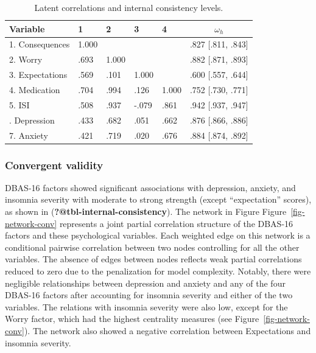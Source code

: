 \documentclass[
  12pt,
  twoside,
  openright,
  a4paper,
  chapter=TITLE,
  section=TITLE,
  brazil]{abntex2}
\begin{document}
\begin{table}[!h]

\caption{Latent correlations and internal consistency levels.}
\centering
\begin{tabular}[t]{lllllc}
\toprule
Variable & 1 & 2 & 3 & 4 & $\omega_h$\\
\midrule
1. Consequences & 1.000 &  &  &  & .827 [.811, .843]\\
2. Worry & .693 & 1.000 &  &  & .882 [.871, .893]\\
3. Expectations & .569 & .101 & 1.000 &  & .600 [.557, .644]\\
4. Medication & .704 & .994 & .126 & 1.000 & .752 [.730, .771]\\
5. ISI & .508 & .937 & -.079 & .861 & .942 [.937, .947]\\
\addlinespace
6. Depression & .433 & .682 & .051 & .662 & .876 [.866, .886]\\
7. Anxiety & .421 & .719 & .020 & .676 & .884 [.874, .892]\\
\bottomrule
\end{tabular}
\end{table}

\hypertarget{convergent-validity}{%
\subsubsection{Convergent validity}\label{convergent-validity}}

DBAS-16 factors showed significant associations with depression,
anxiety, and insomnia severity with moderate to strong strength (except
``expectation'' scores), as shown in
(\textbf{?@tbl-internal-consistency}). The network in Figure
Figure~\ref{fig-network-conv} represents a joint partial correlation
structure of the DBAS-16 factors and these psychological variables. Each
weighted edge on this network is a conditional pairwise correlation
between two nodes controlling for all the other variables. The absence
of edges between nodes reflects weak partial correlations reduced to
zero due to the penalization for model complexity. Notably, there were
negligible relationships between depression and anxiety and any of the
four DBAS-16 factors after accounting for insomnia severity and either
of the two variables. The relations with insomnia severity were also
low, except for the Worry factor, which had the highest centrality
measures (see Figure~\ref{fig-network-conv}). The network also showed a
negative correlation between Expectations and insomnia severity.
\end{document}
